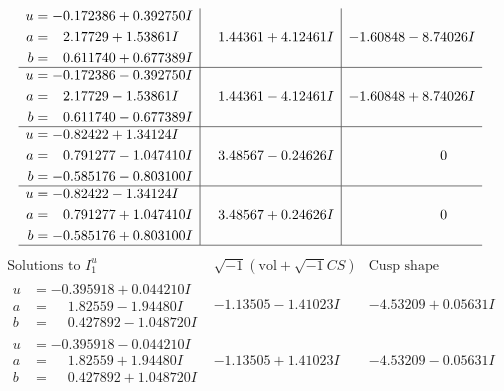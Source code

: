\documentclass[1p]{elsarticle_modified}
\theoremstyle{definition}
\newcommand{\I}{\sqrt{-1}}
\begin{document}
$$\begin{array}{c|c|c}
\begin{aligned}
u &= -0.172386 + 0.392750 I \\
a &= \phantom{-}2.17729 + 1.53861 I \\
b &= \phantom{-}0.611740 + 0.677389 I\end{aligned}
 & \phantom{-}1.44361 + 4.12461 I & -1.60848 - 8.74026 I \\ \hline\begin{aligned}
u &= -0.172386 - 0.392750 I \\
a &= \phantom{-}2.17729 - 1.53861 I \\
b &= \phantom{-}0.611740 - 0.677389 I\end{aligned}
 & \phantom{-}1.44361 - 4.12461 I & -1.60848 + 8.74026 I \\ \hline\begin{aligned}
u &= -0.82422 + 1.34124 I \\
a &= \phantom{-}0.791277 - 1.047410 I \\
b &= -0.585176 - 0.803100 I\end{aligned}
 & \phantom{-}3.48567 - 0.24626 I & \phantom{-0.000000 } 0 \\ \hline\begin{aligned}
u &= -0.82422 - 1.34124 I \\
a &= \phantom{-}0.791277 + 1.047410 I \\
b &= -0.585176 + 0.803100 I\end{aligned}
 & \phantom{-}3.48567 + 0.24626 I & \phantom{-0.000000 } 0\\
 \hline 
 \end{array}$$\newpage$$\begin{array}{c|c|c}  
\text{Solutions to }I^u_{1}& \I (\text{vol} + \sqrt{-1}CS) & \text{Cusp shape}\\
 \hline 
\begin{aligned}
u &= -0.395918 + 0.044210 I \\
a &= \phantom{-}1.82559 - 1.94480 I \\
b &= \phantom{-}0.427892 - 1.048720 I\end{aligned}
 & -1.13505 - 1.41023 I & -4.53209 + 0.05631 I \\ \hline\begin{aligned}
u &= -0.395918 - 0.044210 I \\
a &= \phantom{-}1.82559 + 1.94480 I \\
b &= \phantom{-}0.427892 + 1.048720 I\end{aligned}
 & -1.13505 + 1.41023 I & -4.53209 - 0.05631 I \\ \hline\begin{aligned}

\end{aligned}
\end{array}$$
\end{document}
